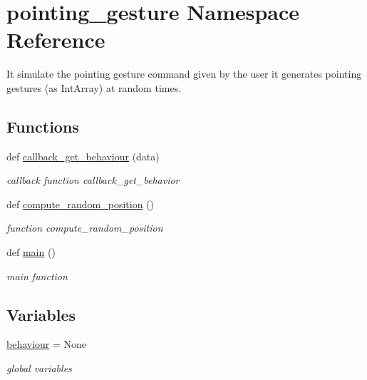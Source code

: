 \hypertarget{namespacepointing__gesture}{}\section{pointing\+\_\+gesture Namespace Reference}
\label{namespacepointing__gesture}


It simulate the pointing gesture command given by the user it generates pointing gestures (as Int\+Array) at random times.  


\subsection*{Functions}
\begin{DoxyCompactItemize}
\item 
def \hyperlink{namespacepointing__gesture_a0ccd291e8028504e94f37e49a5411b3d}{callback\+\_\+get\+\_\+behaviour} (data)
\begin{DoxyCompactList}\small\item\em callback function callback\+\_\+get\+\_\+behavior \end{DoxyCompactList}\item 
def \hyperlink{namespacepointing__gesture_a3f243853d60010878f1a2dbbe2338dbd}{compute\+\_\+random\+\_\+position} ()
\begin{DoxyCompactList}\small\item\em function compute\+\_\+random\+\_\+position \end{DoxyCompactList}\item 
def \hyperlink{namespacepointing__gesture_a0246e9d31b3d0b62a01bdb5b697df181}{main} ()
\begin{DoxyCompactList}\small\item\em main function \end{DoxyCompactList}\end{DoxyCompactItemize}
\subsection*{Variables}
\begin{DoxyCompactItemize}
\item 
\hyperlink{namespacepointing__gesture_a16dc32bb0bc4ae96f247e60f4671e69f}{behaviour} = None
\begin{DoxyCompactList}\small\item\em global variables \end{DoxyCompactList}\end{DoxyCompactItemize}



